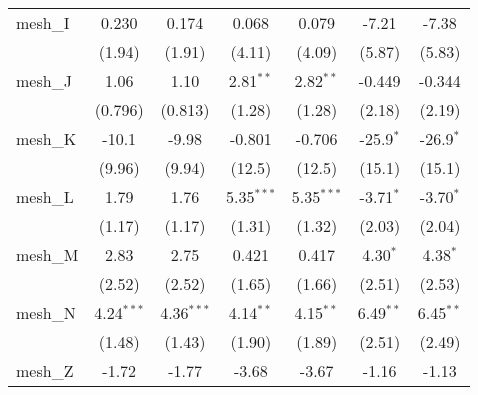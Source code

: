 \begin{tabular}{lcccccc}
   mesh\_I                                                     & 0.230          & 0.174          & 0.068         & 0.079         & -7.21          & -7.38\\   
                                                               & (1.94)         & (1.91)         & (4.11)        & (4.09)        & (5.87)         & (5.83)\\   
   mesh\_J                                                     & 1.06           & 1.10           & 2.81$^{**}$   & 2.82$^{**}$   & -0.449         & -0.344\\   
                                                               & (0.796)        & (0.813)        & (1.28)        & (1.28)        & (2.18)         & (2.19)\\   
   mesh\_K                                                     & -10.1          & -9.98          & -0.801        & -0.706        & -25.9$^{*}$    & -26.9$^{*}$\\   
                                                               & (9.96)         & (9.94)         & (12.5)        & (12.5)        & (15.1)         & (15.1)\\   
   mesh\_L                                                     & 1.79           & 1.76           & 5.35$^{***}$  & 5.35$^{***}$  & -3.71$^{*}$    & -3.70$^{*}$\\   
                                                               & (1.17)         & (1.17)         & (1.31)        & (1.32)        & (2.03)         & (2.04)\\   
   mesh\_M                                                     & 2.83           & 2.75           & 0.421         & 0.417         & 4.30$^{*}$     & 4.38$^{*}$\\   
                                                               & (2.52)         & (2.52)         & (1.65)        & (1.66)        & (2.51)         & (2.53)\\   
   mesh\_N                                                     & 4.24$^{***}$   & 4.36$^{***}$   & 4.14$^{**}$   & 4.15$^{**}$   & 6.49$^{**}$    & 6.45$^{**}$\\   
                                                               & (1.48)         & (1.43)         & (1.90)        & (1.89)        & (2.51)         & (2.49)\\   
   mesh\_Z                                                     & -1.72          & -1.77          & -3.68         & -3.67         & -1.16          & -1.13\\   

\end{tabular}
